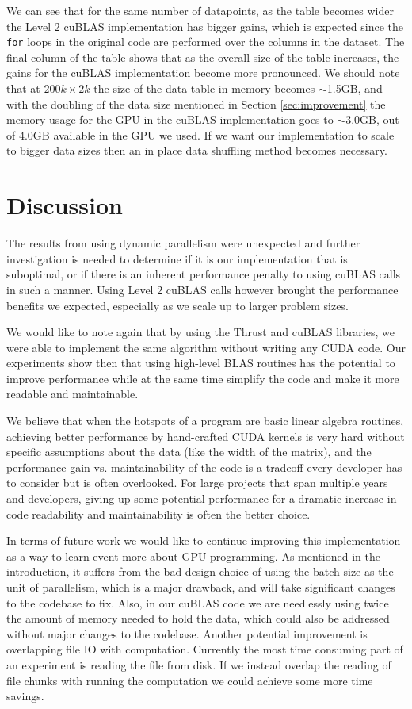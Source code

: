 \documentclass[11pt,a4paper]{article}
\begin{document}
We can see that for the same number of datapoints, as the table becomes wider the Level 2 cuBLAS
implementation has bigger gains, which is expected since the \texttt{for} loops in the original
code are performed over the columns in the dataset. The final column of the table shows that as 
the overall size of the table increases, the gains for the cuBLAS implementation become more
pronounced. We should note that at $200k \times 2k$ the size of the data table in memory becomes $\sim$1.5GB,
and with the doubling of the data size mentioned in Section \ref{sec:improvement} the memory usage
for the GPU in the cuBLAS implementation goes to $\sim$3.0GB, out of 4.0GB available in the GPU we used. If we want
our implementation to scale to bigger data sizes then an in place data shuffling method becomes necessary.

\section{Discussion}
\label{sec:discussion}

The results from using dynamic parallelism were unexpected and further investigation is needed
to determine if it is our implementation that is suboptimal, or if there is an inherent performance
penalty to using cuBLAS calls in such a manner. Using Level 2 cuBLAS calls however brought 
the performance benefits we expected, especially as we scale up to larger problem sizes.

We would like to note again that by using the Thrust and cuBLAS libraries,
we were able to implement the same algorithm without writing any CUDA code.
Our experiments show then that using high-level BLAS routines has the potential
to improve performance while at the same time simplify the code and make it
more readable and maintainable.

We believe that when the hotspots of a program are basic linear algebra routines,
achieving better performance by hand-crafted CUDA kernels is very hard without
specific assumptions about the data (like the width of the matrix), and the performance gain vs. maintainability
of the code is a tradeoff every developer has to consider but is often overlooked.
For large projects that span multiple years and developers, giving up some potential
performance for a dramatic increase in code readability and maintainability is often
the better choice.

In terms of future work we would like to continue improving this implementation
as a way to learn event more about GPU programming. As mentioned in the introduction, it suffers from the bad design
choice of using the batch size as the unit of parallelism, which is a major drawback,
and will take significant changes to the codebase to fix.
Also, in our cuBLAS code we are needlessly using twice the amount of memory needed
to hold the data, which could also be addressed without major changes to the codebase.
Another potential improvement is overlapping file IO with computation. Currently
the most time consuming part of an experiment is reading the file from disk.
If we instead overlap the reading of file chunks with running the computation
we could achieve some more time savings.




\end{document}
